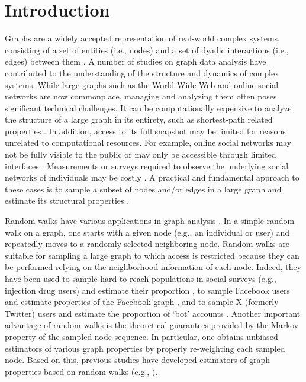 \section{Introduction} \label{section:1}

Graphs are a widely accepted representation of real-world complex systems, consisting of a set of entities (i.e., nodes) and a set of dyadic interactions (i.e., edges) between them \cite{newman2018}. 
A number of studies on graph data analysis have contributed to the understanding of the structure and dynamics of complex systems. 
While large graphs such as the World Wide Web and online social networks are now commonplace, managing and analyzing them often poses significant technical challenges. 
It can be computationally expensive to analyze the structure of a large graph in its entirety, such as shortest-path related properties \cite{brandes2008}.
In addition, access to its full snapshot may be limited for reasons unrelated to computational resources. 
For example, online social networks may not be fully visible to the public or may only be accessible through limited interfaces \cite{mislove2007}. 
Measurements or surveys required to observe the underlying social networks of individuals may be costly \cite{salganik2004}. 
A practical and fundamental approach to these cases is to sample a subset of nodes and/or edges in a large graph and estimate its structural properties \cite{leskovec2006, ahmed2013}.

Random walks have various applications in graph analysis \cite{lovasz1993, masuda2017}.
In a simple random walk on a graph, one starts with a given node (e.g., an individual or user) and repeatedly moves to a randomly selected neighboring node.
Random walks are suitable for sampling a large graph to which access is restricted because they can be performed relying on the neighborhood information of each node.
Indeed, they have been used to sample hard-to-reach populations in social surveys (e.g., injection drug users) and estimate their proportion \cite{salganik2004}, to sample Facebook users and estimate properties of the Facebook graph \cite{gjoka2011}, and to sample X (formerly Twitter) users and estimate the proportion of `bot' accounts \cite{fukuda2022}.
Another important advantage of random walks is the theoretical guarantees provided by the Markov property of the sampled node sequence. 
In particular, one obtains unbiased estimators of various graph properties by properly re-weighting each sampled node. 
Based on this, previous studies have developed estimators of graph properties based on random walks (e.g., \cite{gjoka2011, ribeiro2010, hardiman2013, wang2014, chen2016}).

